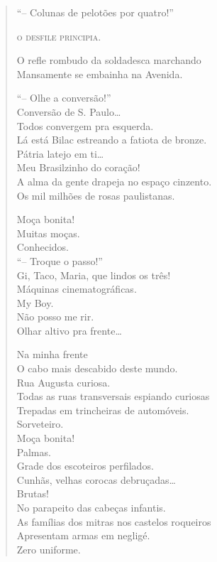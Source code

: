 \begin{verse}
``-- Colunas de pelotões por quatro!''

\textsc{o desfile principia.}

O refle rombudo da soldadesca marchando\\
Mansamente se embainha na Avenida.

``-- Olhe a conversão!''\\
\qquad\quad Conversão de S. Paulo\ldots{}\\
Todos convergem pra esquerda.\\
Lá está Bilac estreando a fatiota de bronze.\\
\qquad\quad Pátria latejo em ti\ldots{}\\
Meu Brasilzinho do coração!\\
A alma da gente drapeja no espaço cinzento.\\
Os mil milhões de rosas paulistanas.

Moça bonita!\\
Muitas moças.\\
Conhecidos.\\
``-- Troque o passo!''\\
Gi, Taco, Maria, que lindos os três!\\
Máquinas cinematográficas.\\
\qquad\qquad\qquad My Boy.\\
\qquad\qquad Não posso me rir.\\
Olhar altivo pra frente\ldots{}

Na minha frente\\
O cabo mais descabido deste mundo.\\
Rua Augusta curiosa.\\
Todas as ruas transversais espiando curiosas\\
Trepadas em trincheiras de automóveis.\\
Sorveteiro.\\
Moça bonita!\\
Palmas.\\
Grade dos escoteiros perfilados.\\
Cunhãs, velhas corocas debruçadas\ldots{}\\
\qquad\quad\qquad\quad\qquad\quad\qquad\quad\qquad\quad Brutas!\\
No parapeito das cabeças infantis.\\
As famílias dos mitras nos castelos roqueiros\\
Apresentam armas em negligé.\\
\qquad\quad\qquad\qquad Zero uniforme.


\end{verse}
